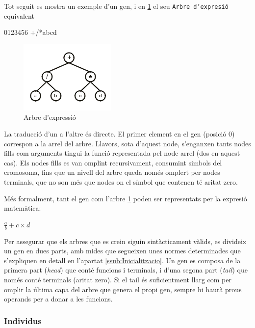 Tot seguit es mostra un exemple d'un gen, i en \ref{fig:expression tree1} el seu
\texttt{Arbre d'expresió} equivalent

\begin{center}
0123456    
+/*abcd
\end{center}

\begin{figure}[h]
\begin{center}
\includegraphics{intro/et1.png}
\end{center}
\caption{Arbre d'expressió}
\label{fig:expression tree1}
\end{figure}

La traducció d'un a l'altre és directe.  El primer element en el gen (posició
0) correspon a la arrel del arbre.  Llavors, sota d'aquest node, s'enganxen
tants nodes fills com arguments tingui la funció representada pel node arrel
(dos en aquest cas). Els nodes fills es van omplint recursivament, consumint
simbols del cromosoma, fins que un nivell del arbre queda només omplert per
nodes terminals, que no son més que nodes on el símbol que contenen té aritat
zero.

Més formalment, tant el gen com l'arbre \ref{fig:expression tree1} poden ser
representats per la expresió matemàtica:

	$\frac{a}{b}+c \times d$

Per assegurar que els arbres que es crein siguin sintàcticament vàlids, es
divideix un gen en dues parts, amb mides que segueixen unes normes determinades
que s'expliquen en detall en l'apartat \ref{ssub:Inicialitzacio}.  Un gen es
composa de la primera part (\emph{head}) que conté funcions i terminals, i d'una
segona part (\emph{tail}) que només conté terminals (aritat zero). Si el tail és
suficientment llarg com per omplir la última capa del arbre que genera el propi
gen, sempre hi haurà prous operands per a donar a les funcions.


\subsubsection{Individus} %
\label{issub:individus}

